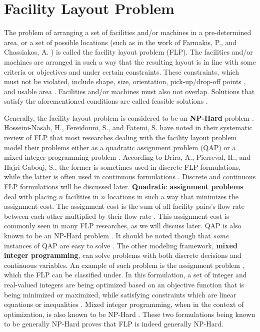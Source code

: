 \section{Facility Layout Problem}
The problem of arranging a set of facilities and/or machines in a pre-determined area, or a set of possible locations (such as in the work of Farmakis, P., and Chassiakos, A. \cite{Farmakis2018}) is called the facility layout problem (FLP). The facilities and/or machines are arranged in such a way that the resulting layout is in line with some criteria or objectives and under certain constraints. These constraints, which must not be violated, include shape, size, orientation, pick-up/drop-off points \cite{Hosseini-Nasab2018}, and usable area \cite{Fernando2015}. Facilities and/or machines must also not overlap. Solutions that satisfy the aforementioned conditions are called feasible solutions \cite{Meller1996}.

Generally, the facility layout problem is considered to be an \textbf{NP-Hard} problem \cite{Drira2007}. Hosseini-Nasab, H., Fereidouni, S., and Fatemi, S. have noted in their systematic review of FLP that most researches dealing with the facility layout problem model their problems either as a quadratic assignment problem (QAP) or a mixed integer programming problem \cite{Hosseini-Nasab2018}. According to Drira, A., Pierreval, H., and Hajri-Gabouj, S., the former is sometimes used in discrete FLP formulations, while the latter is often used in continuous formulations \cite{Drira2007}. Discrete and continuous FLP formulations will be discussed later. \textbf{Quadratic assignment problems} deal with placing $n$ facilities in $n$ locations in such a way that minimizes the assignment cost. The assignment cost is the sum of all facility pairs's flow rate between each other multiplied by their flow rate \cite{QAPDefinition}. This assignment cost is commonly seen in many FLP researches, as we will discuss later. QAP is also known to be an NP-Hard problem \cite{Garey1979}. It should be noted though that \textit{some} instances of QAP are easy to solve \cite{Feizollahi2015}. The other modeling framework, \textbf{mixed integer programming}, can solve problems with both discrete decisions and continuous variables. An example of such problem is the assignment problem \cite{Richards2005}, which the FLP can be classified under. In this formulation, a set of integer and real-valued integers are being optimized based on an objective function that is being minimized or maximized, while satisfying constraints which are linear equations or inequalities \cite{Wolsey2008}. Mixed integer programming, when in the context of optimization, is also known to be NP-Hard \cite{Richards2005}. These two formulations being known to be generally NP-Hard proves that FLP is indeed generally NP-Hard.

